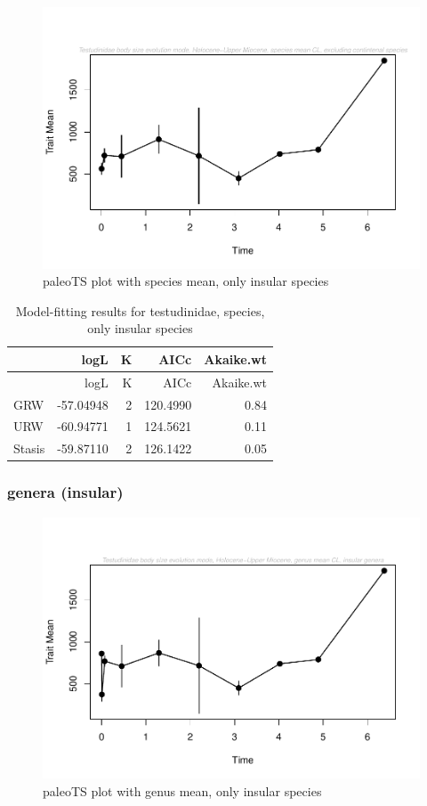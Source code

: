 \documentclass[]{article}
\begin{document}
\begin{figure}[htbp]
\centering
\includegraphics{MA_JJ_files/figure-latex/paleoTS plot with species mean, excluding continental species-1.pdf}
\caption{paleoTS plot with species mean, only insular species}
\end{figure}

\begin{longtable}[]{@{}lrrrr@{}}
\caption{Model-fitting results for testudinidae, species, only insular
species}\tabularnewline
\toprule
& logL & K & AICc & Akaike.wt\tabularnewline
\midrule
\endfirsthead
\toprule
& logL & K & AICc & Akaike.wt\tabularnewline
\midrule
\endhead
GRW & -57.04948 & 2 & 120.4990 & 0.84\tabularnewline
URW & -60.94771 & 1 & 124.5621 & 0.11\tabularnewline
Stasis & -59.87110 & 2 & 126.1422 & 0.05\tabularnewline
\bottomrule
\end{longtable}

\newpage

\subsubsection{genera (insular)}\label{genera-insular}

\begin{figure}[htbp]
\centering
\includegraphics{MA_JJ_files/figure-latex/paleoTS plot with genus mean, excluding continental species-1.pdf}
\caption{paleoTS plot with genus mean, only insular species}
\end{figure}
\end{document}
